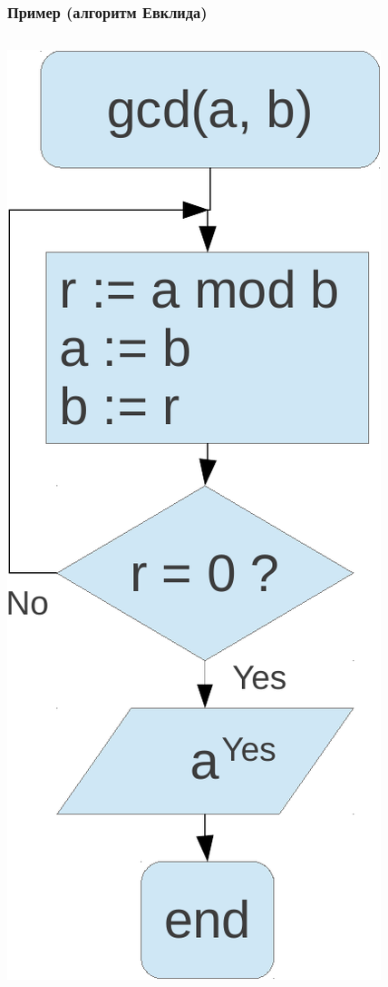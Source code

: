 \documentclass{beamer}
\begin{document}
    \begin{frame}[fragile]
        \frametitle{Пример (алгоритм Евклида)}
        \begin{columns}
            \includegraphics[width=\linewidth]{fig/gcd.pdf}

\end{columns}
\end{frame}
\end{document}
